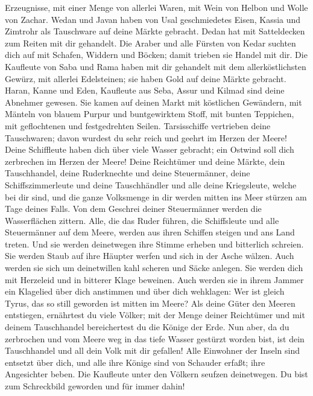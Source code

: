 Erzeugnisse, mit einer Menge von allerlei Waren, mit Wein von Helbon und
Wolle von Zachar.  Wedan und Javan haben von Usal
geschmiedetes Eisen, Kassia und Zimtrohr als Tauschware auf deine Märkte
gebracht.  Dedan hat mit Satteldecken zum Reiten mit dir
gehandelt.  Die Araber und alle Fürsten von Kedar suchten
dich auf mit Schafen, Widdern und Böcken; damit trieben sie Handel mit
dir.  Die Kaufleute von Saba und Rama haben mit dir
gehandelt mit dem allerköstlichsten Gewürz, mit allerlei Edelsteinen;
sie haben Gold auf deine Märkte gebracht.  Haran, Kanne
und Eden, Kaufleute aus Seba, Assur und Kilmad sind deine Abnehmer
gewesen.  Sie kamen auf deinen Markt mit köstlichen
Gewändern, mit Mänteln von blauem Purpur und buntgewirktem Stoff, mit
bunten Teppichen, mit geflochtenen und festgedrehten Seilen.
 Tarsisschiffe vertrieben deine Tauschwaren; davon
wurdest du sehr reich und geehrt im Herzen der Meere! 
Deine Schiffleute haben dich über viele Wasser gebracht; ein Ostwind
soll dich zerbrechen im Herzen der Meere!  Deine
Reichtümer und deine Märkte, dein Tauschhandel, deine Ruderknechte und
deine Steuermänner, deine Schiffszimmerleute und deine Tauschhändler und
alle deine Kriegsleute, welche bei dir sind, und die ganze Volksmenge in
dir werden mitten ins Meer stürzen am Tage deines Falls. 
Von dem Geschrei deiner Steuermänner werden die Wasserflächen zittern.
 Alle, die das Ruder führen, die Schiffsleute und alle
Steuermänner auf dem Meere, werden aus ihren Schiffen steigen und ans
Land treten.  Und sie werden deinetwegen ihre Stimme
erheben und bitterlich schreien. Sie werden Staub auf ihre Häupter
werfen und sich in der Asche wälzen.  Auch werden sie
sich um deinetwillen kahl scheren und Säcke anlegen. Sie werden dich mit
Herzeleid und in bitterer Klage beweinen.  Auch werden
sie in ihrem Jammer ein Klagelied über dich anstimmen und über dich
wehklagen: Wer ist gleich Tyrus, das so still geworden ist mitten im
Meere?  Als deine Güter den Meeren entstiegen, ernährtest
du viele Völker; mit der Menge deiner Reichtümer und mit deinem
Tauschhandel bereichertest du die Könige der Erde.  Nun
aber, da du zerbrochen und vom Meere weg in das tiefe Wasser gestürzt
worden bist, ist dein Tauschhandel und all dein Volk mit dir gefallen!
 Alle Einwohner der Inseln sind entsetzt über dich, und
alle ihre Könige sind von Schauder erfaßt; ihre Angesichter beben.
 Die Kaufleute unter den Völkern seufzen deinetwegen. Du
bist zum Schreckbild geworden und für immer dahin!

